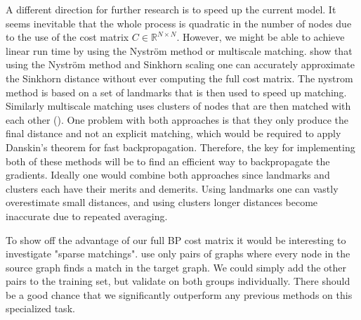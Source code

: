 A different direction for further research is to speed up the current model. It seems inevitable that the whole process is quadratic in the number of nodes due to the use of the cost matrix $C \in \mathbb{R}^{N \times N}$. However, we might be able to achieve linear run time by using the Nystr{\"{o}}m method or multiscale matching. \cite{nytrom2019} show that using the Nystr{\"{o}}m method and Sinkhorn scaling one can accurately approximate the Sinkhorn distance without ever computing the full cost matrix. The nystrom method is based on a set of landmarks that is then used to speed up matching. Similarly multiscale matching uses clusters of nodes that are then matched with each other (\citealp{multiscale2016}). One problem with both approaches is that they only produce the final distance and not an explicit matching, which would be required to apply Danskin's theorem for fast backpropagation. Therefore, the key for implementing both of these methods will be to find an efficient way to backpropagate the gradients. Ideally one would combine both approaches since landmarks and clusters each have their merits and demerits. Using landmarks one can vastly overestimate small distances, and using clusters longer distances become inaccurate due to repeated averaging.

To show off the advantage of our full BP cost matrix it would be interesting to investigate "sparse matchings". \cite{fey2020_update} use only pairs of graphs where every node in the source graph finds a match in the target graph. We could simply add the other pairs to the training set, but validate on both groups individually. There should be a good chance that we significantly outperform any previous methods on this specialized task.
